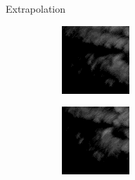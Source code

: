 \documentclass{beamer}
\begin{document}
\begin{frame}{Extrapolation}
	\begin{figure}
	    \begin{subfigure}{.3\textwidth}
	        \centering
	        \includegraphics[width=\linewidth]{fig/extra/0.png}
	    \end{subfigure}
	    \begin{subfigure}{.3\textwidth}
	        \centering
	        \begin{mdframed}[style=blue,nobreak=true,align=center]
	        \includegraphics[width=\linewidth]{fig/extra/1.png}

\end{mdframed}
\end{subfigure}
\end{figure}
\end{frame}
\end{document}
